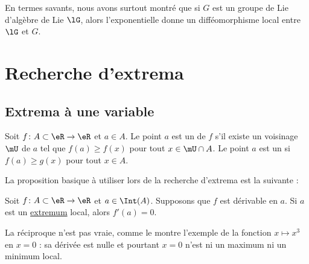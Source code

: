 \begin{remark}
    En termes savants, nous avons surtout montré que si \( G\) est un groupe de Lie d'algèbre de Lie \( \lG\), alors l'exponentielle donne un difféomorphisme local entre \( \lG\) et \( G\).
\end{remark}

\section{Recherche d'extrema}

\subsection{Extrema à une variable}

\begin{definition}
Soit $f\colon A\subset \eR\to \eR$ et $a\in A$. Le point $a$ est un  de $f$ s'il existe un voisinage $\mU$ de $a$ tel que $f(a)\geq f(x)$ pour tout $x\in\mU\cap A$. Le point $a$ est un  si $f(a)\geq g(x)$ pour tout $x\in A$.
\end{definition}

La proposition basique à utiliser lors de la recherche d'extrema est la suivante :
\begin{proposition}     \label{PROPooNVKXooXtKkuz}
Soit $f\colon A\subset\eR\to \eR$ et $a\in\Int(A)$. Supposons que $f$ est dérivable en $a$. Si $a$ est un \href{http://fr.wikipedia.org/wiki/Extremum}{extremum} local, alors $f'(a)=0$.
\end{proposition}

La réciproque n'est pas vraie, comme le montre l'exemple de la fonction $x\mapsto x^3$ en $x=0$ : sa dérivée est nulle et pourtant $x=0$ n'est ni un maximum ni un minimum local. 

